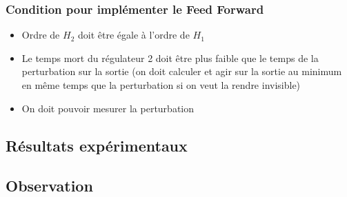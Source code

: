 \subsubsection{Condition pour implémenter le Feed Forward}
\begin{itemize}
\item Ordre de $H_{2}$ doit être égale à l'ordre de $H_{1}$
\item Le temps mort du régulateur 2 doit être plus faible que le temps de la perturbation sur la sortie (on doit calculer et agir sur la sortie au minimum en même temps que la perturbation si on veut la rendre invisible)
\item On doit pouvoir mesurer la perturbation
\end{itemize}

\subsection{Résultats expérimentaux}

\subsection{Observation}